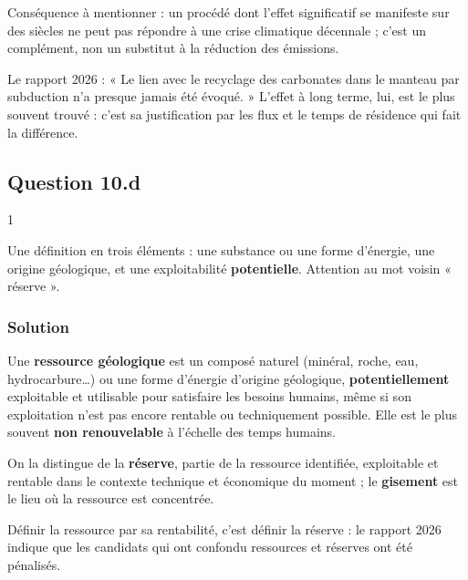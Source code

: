 \documentclass[11pt,a4paper]{article}
\begin{document}
Conséquence à mentionner : un procédé dont l'effet significatif se manifeste sur des siècles ne peut pas répondre à une crise climatique décennale ; c'est un complément, non un substitut à la réduction des émissions.

\begin{jury}

Le rapport 2026 : « Le lien avec le recyclage des carbonates dans le manteau par subduction n'a presque jamais été évoqué. » L'effet à long terme, lui, est le plus souvent trouvé : c'est sa justification par les flux et le temps de résidence qui fait la différence.

\end{jury}

\hypertarget{question-10.d}{%
\subsection{Question 10.d}\label{question-10.d}}

\begin{indication}{1}

Une définition en trois éléments : une substance ou une forme d'énergie, une origine géologique, et une exploitabilité \textbf{potentielle}. Attention au mot voisin « réserve ».

\end{indication}

\hypertarget{solution-33}{%
\subsubsection{Solution}\label{solution-33}}

Une \textbf{ressource géologique} est un composé naturel (minéral, roche, eau, hydrocarbure\ldots) ou une forme d'énergie d'origine géologique, \textbf{potentiellement} exploitable et utilisable pour satisfaire les besoins humains, même si son exploitation n'est pas encore rentable ou techniquement possible. Elle est le plus souvent \textbf{non renouvelable} à l'échelle des temps humains.

On la distingue de la \textbf{réserve}, partie de la ressource identifiée, exploitable et rentable dans le contexte technique et économique du moment ; le \textbf{gisement} est le lieu où la ressource est concentrée.

\begin{piege}

Définir la ressource par sa rentabilité, c'est définir la réserve : le rapport 2026 indique que les candidats qui ont confondu ressources et réserves ont été pénalisés.

\end{piege}
\end{document}

